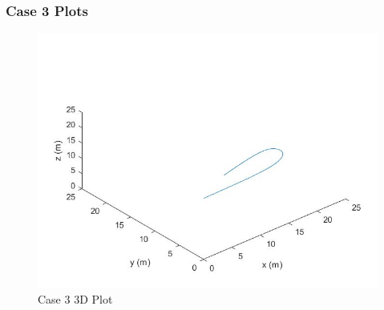 \documentclass[12pt,twoside,letterpaper]{article}
\begin{document}
\subsubsection{Case 3 Plots}
\begin{figure}[H]
\centering
\includegraphics[width=15cm]{figures/case_3_3D.jpg}
\caption{Case 3 3D Plot}
\label{Case 3 3D Plot}
\end{figure}
\end{document}
